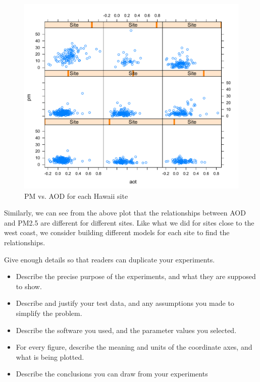 \documentclass[10pt]{article}
\begin{document}
\begin{figure}[!h]
\centering
\includegraphics[width=\linewidth]{1.pdf}
\caption{PM vs. AOD for each Hawaii site}
\label{fig3.4}
\end{figure}

Similarly, we can see from the above plot that the relationships between AOD and PM2.5 are different for different sites. Like what we did for sites close to the west coast, we consider building different models for each site to find the relationships.



Give enough details so that readers can duplicate your experiments.

\begin{itemize}
\item Describe the precise purpose of the experiments, and what they 
are supposed to show.

\item Describe and justify your test data, and any assumptions you made to 
simplify the problem.

\item Describe the software you used, and the 
parameter values you selected.

\item 
For every figure, describe the meaning and units of the coordinate axes, 
and what is being plotted.

\item Describe the conclusions you can draw from your experiments
\end{itemize}
\end{document}
